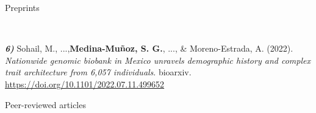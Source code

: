

\large{Preprints}

\begin{cventries}
\cventry
{$\;$}
{$\;$}
{$\;$}
{$\;$}
{
  \begin{cvitems} %
      \item {
          \begin{flushleft}
            \textit{\textbf{6)}} Sohail, M., ...,\textbf{Medina-Muñoz, S. G.}, ..., \& Moreno-Estrada, A. (2022).
            \textit{Nationwide genomic biobank in Mexico unravels demographic history and complex trait architecture from 6,057 individuals}. bioarxiv.\\
            \url{https://doi.org/10.1101/2022.07.11.499652}
          \end{flushleft}
        }
  \end{cvitems}
}


\end{cventries}


\large{Peer-reviewed articles}

